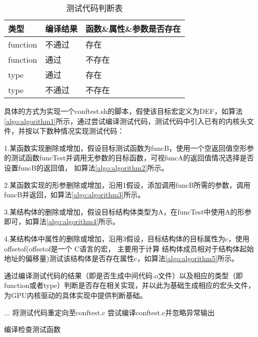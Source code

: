 \begin{table}[h]
  \centering
  \caption{测试代码判断表}
  \label{tab:测试代码判断表}
  \begin{tabular}{lll}
    \toprule
    类型   &   编译结果 & 函数\&属性\&参数是否存在    \\
    \midrule
    function & 不通过 & 存在 \\
    function & 通过 & 不存在 \\
    type & 通过 & 存在 \\
    type & 不通过 & 不存在 \\
    \bottomrule
  \end{tabular}
\end{table}

具体的方式为实现一个conftest.sh的脚本，假使该目标宏定义为DEF，如算法\ref{algo:algorithm1}所示，通过尝试编译测试代码，测试代码中引入已有的内核头文件，并按以下数种情况实现测试代码：

1.某函数实现删除或增加，假设目标测试函数为funcB，使用一个空返回值空形参的测试函数funcTest并调用无参数的目标函数，可视funcA的返回值情况选择是否设置funcB的返回值，
如算法\ref{algo:algorithm2}所示。

2.某函数实现的形参删除或增加，沿用1假设，添加调用funcB所需的参数，调用funcB并返回，如算法\ref{algo:algorithm3}所示。

3.某结构体的删除或增加，假设目标结构体类型为A，在funcTest中使用A的形参即可，如算法\ref{algo:algorithm4}所示。

4.某结构体中属性的删除或增加，沿用3假设，目标结构体的目标属性为c，使用offsetof(offsetof是一个 C语言的宏，
主要用于计算 结构体成员相对于结构体起始地址的偏移量)测试该结构体是否存在属性c，如算法\ref{algo:algorithm5}所示。

通过编译测试代码的结果（即是否生成中间代码.o文件）以及相应的类型（即function或者type）判断是否存在相关实现，并以此为基础生成相应的宏头文件，为GPU内核驱动的具体实现中提供判断基础。

\begin{algorithm}[h]
  \SetAlgoLined
  ...\;
  将测试代码重定向至conftest.c\;
  尝试编译conftest.c并忽略异常输出\;
  \caption{编译检查测试函数}
  \label{algo:algorithm1}
\end{algorithm}

